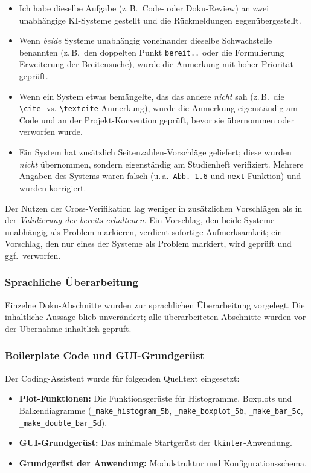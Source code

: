 \begin{itemize}
    \item Ich habe dieselbe Aufgabe (z.\,B.\ Code- oder Doku-Review) an zwei unabhängige \acs{KI}-Systeme gestellt und die Rückmeldungen gegenübergestellt.
    \item Wenn \textit{beide} Systeme unabhängig voneinander dieselbe Schwachstelle benannten (z.\,B.\ den doppelten Punkt \texttt{bereit..} oder die Formulierung \glqq{}Erweiterung der Breitensuche\grqq{}), wurde die Anmerkung mit hoher Priorität geprüft.
    \item Wenn ein System etwas bemängelte, das das andere \textit{nicht} sah (z.\,B.\ die \texttt{\textbackslash cite}- vs. \texttt{\textbackslash textcite}-Anmerkung), wurde die Anmerkung eigenständig am Code und an der Projekt-Konvention geprüft, bevor sie übernommen oder verworfen wurde.
    \item Ein System hat zusätzlich Seitenzahlen-Vorschläge geliefert; diese wurden \textit{nicht} übernommen, sondern eigenständig am Studienheft verifiziert. Mehrere Angaben des Systems waren falsch (u.\,a.\ \texttt{Abb.~1.6} und \texttt{next}-Funktion) und wurden korrigiert.
\end{itemize}

Der Nutzen der Cross-Verifikation lag weniger in zusätzlichen Vorschlägen als in der \textit{Validierung der bereits erhaltenen}. Ein Vorschlag, den beide Systeme unabhängig als Problem markieren, verdient sofortige Aufmerksamkeit; ein Vorschlag, den nur eines der Systeme als Problem markiert, wird geprüft und ggf.\ verworfen.

\subsubsection{Sprachliche Überarbeitung}

Einzelne Doku-Abschnitte wurden zur sprachlichen Überarbeitung vorgelegt. Die inhaltliche Aussage blieb unverändert; alle überarbeiteten Abschnitte wurden vor der Übernahme inhaltlich geprüft.

\subsubsection{Boilerplate Code und \acs{GUI}-Grundgerüst}

Der Coding-Assistent wurde für folgenden Quelltext eingesetzt:

\begin{itemize}
    \item \textbf{Plot-Funktionen:} Die Funktionsgerüste für Histogramme, Boxplots und Balkendiagramme (\texttt{\_make\_histogram\_5b}, \texttt{\_make\_boxplot\_5b}, \texttt{\_make\_bar\_5c}, \\ \texttt{\_make\_double\_bar\_5d}).
    \item \textbf{\acs{GUI}-Grundgerüst:} Das minimale Startgerüst der \texttt{tkinter}-Anwendung.
    \item \textbf{Grundgerüst der Anwendung:} Modulstruktur und Konfigurationsschema.
\end{itemize}

